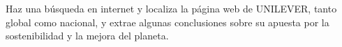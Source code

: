 

%
%
%


{}
\fsection{\boldit{\textcolor{waveBlue2}{INVESTGA}}}
Haz una búsqueda en internet y localiza la página web de UNILEVER, tanto global como nacional, 
y extrae algunas conclusiones sobre su apuesta por la sostenibilidad y la mejora del planeta.


